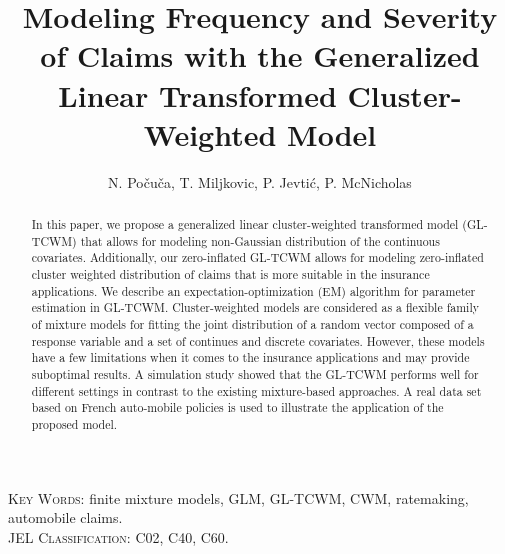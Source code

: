 \documentclass[11pt,letterpaper]{article}
\numberwithin{equation}{section}
\numberwithin{equation}{section}
\numberwithin{equation}{section}
\begin{document}
\title{\bf Modeling  Frequency and Severity of Claims with the Generalized Linear Transformed Cluster-Weighted Model}

\author{N. Po\v cu\v ca, T. Miljkovic,  P. Jevti\' c, P. McNicholas  }%

\maketitle
\doublespacing
\small

\begin{abstract}

In this paper, we propose a generalized linear cluster-weighted transformed model (GL-TCWM) that allows for modeling non-Gaussian distribution of the continuous covariates. Additionally, our zero-inflated GL-TCWM allows for modeling zero-inflated cluster weighted distribution of claims that is more suitable in the insurance applications. We describe an expectation-optimization (EM) algorithm for parameter estimation in GL-TCWM. Cluster-weighted models are considered as a flexible family of mixture models for fitting the joint distribution of a random vector composed of a response variable and a set of continues and discrete covariates. However, these models have a few limitations when it comes to the insurance applications and may provide suboptimal results. A simulation study showed that the GL-TCWM performs well for different settings in contrast to the existing mixture-based approaches. A real data set based on French auto-mobile policies is used to illustrate the application of the proposed model.

\end{abstract}
\textsc{Key Words:} finite mixture models, GLM, GL-TCWM, CWM, ratemaking, automobile claims.\\
\textsc{JEL Classification:}  C02, C40, C60.\\
\end{document}
